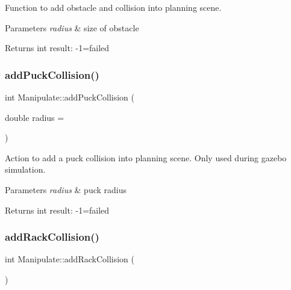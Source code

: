 Function to add obstacle and collision into planning scene. 


\begin{DoxyParams}{Parameters}
{\em radius} & size of obstacle \\
\hline
\end{DoxyParams}
\begin{DoxyReturn}{Returns}
int result\+: -\/1=failed 
\end{DoxyReturn}
\mbox{\label{structManipulate_adeeb6f85db89cf573e22bcb73c806c70}} 
\subsubsection{\texorpdfstring{add\+Puck\+Collision()}{addPuckCollision()}}
{\footnotesize\ttfamily int Manipulate\+::add\+Puck\+Collision (\begin{DoxyParamCaption}\item[{double}]{radius = {} }\end{DoxyParamCaption})\hspace{0.3cm}{\ttfamily [private]}}



Action to add a puck collision into planning scene. Only used during gazebo simulation. 


\begin{DoxyParams}{Parameters}
{\em radius} & puck radius \\
\hline
\end{DoxyParams}
\begin{DoxyReturn}{Returns}
int result\+: -\/1=failed 
\end{DoxyReturn}
\mbox{\label{structManipulate_a33209024eebea398fd7e81c493e0a049}} 
\subsubsection{\texorpdfstring{add\+Rack\+Collision()}{addRackCollision()}}
{\footnotesize\ttfamily int Manipulate\+::add\+Rack\+Collision (\begin{DoxyParamCaption}{ }\end{DoxyParamCaption})\hspace{0.3cm}{\ttfamily [private]}}



